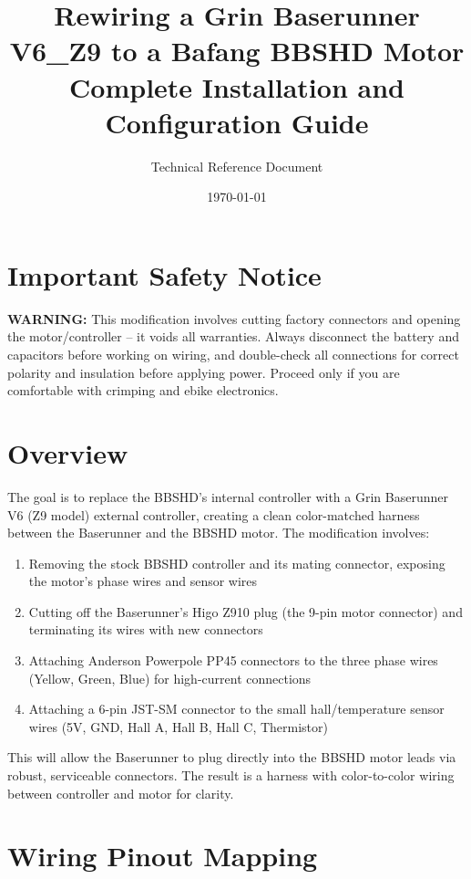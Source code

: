 \documentclass[11pt,a4paper]{article}
\title{\textbf{Rewiring a Grin Baserunner V6\_Z9 to a Bafang BBSHD Motor}\\
\large Complete Installation and Configuration Guide}
\author{Technical Reference Document}
\date{\today}
\newcommand{\warning}[1]{\textcolor{warningcolor}{\textbf{WARNING:} #1}}
\begin{document}
\maketitle
\tableofcontents
\newpage

\section{Important Safety Notice}

\warning{This modification involves cutting factory connectors and opening the motor/controller -- it voids all warranties. Always disconnect the battery and capacitors before working on wiring, and double-check all connections for correct polarity and insulation before applying power. Proceed only if you are comfortable with crimping and ebike electronics.}

\section{Overview}

The goal is to replace the BBSHD's internal controller with a Grin Baserunner V6 (Z9 model) external controller, creating a clean color-matched harness between the Baserunner and the BBSHD motor. The modification involves:

\begin{enumerate}
    \item Removing the stock BBSHD controller and its mating connector, exposing the motor's phase wires and sensor wires
    \item Cutting off the Baserunner's Higo Z910 plug (the 9-pin motor connector) and terminating its wires with new connectors
    \item Attaching Anderson Powerpole PP45 connectors to the three phase wires (Yellow, Green, Blue) for high-current connections
    \item Attaching a 6-pin JST-SM connector to the small hall/temperature sensor wires (5V, GND, Hall A, Hall B, Hall C, Thermistor)
\end{enumerate}

This will allow the Baserunner to plug directly into the BBSHD motor leads via robust, serviceable connectors. The result is a harness with color-to-color wiring between controller and motor for clarity.

\section{Wiring Pinout Mapping}
\end{document}
